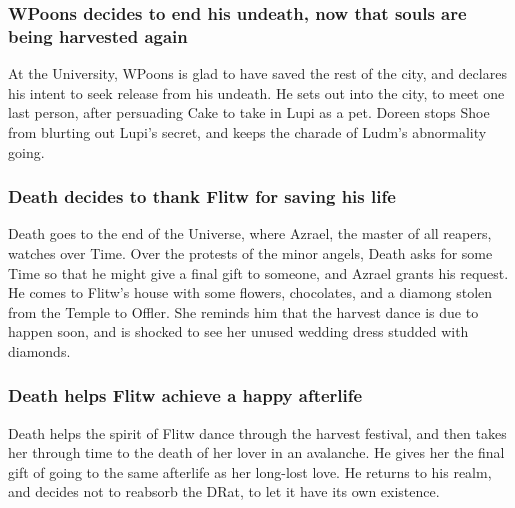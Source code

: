 \subsubsection{\Gls{WPoons} decides to end his undeath, now that souls are being harvested again}
At the University, \Gls{WPoons} is glad to have saved the rest of the city, and declares his intent
to seek release from his undeath. He sets out into the city, to meet one last person, after
persuading \Gls{Cake} to take in \Gls{Lupi} as a pet. \Gls{Doreen} stops \Gls{Shoe} from blurting
out \Gls{Lupi}'s secret, and keeps the charade of \Gls{Ludm}'s abnormality going.

\subsubsection{\Gls{Death} decides to thank \Gls{Flitw} for saving his life}
\Gls{Death} goes to the end of the Universe, where \Gls{Azrael}, the master of all reapers, watches
over Time. Over the protests of the minor angels, \Gls{Death} asks for some Time so that he might
give a final gift to someone, and \Gls{Azrael} grants his request. He comes to \Gls{Flitw}'s house
with some flowers, chocolates, and a diamong stolen from the Temple to Offler. She reminds him that
the harvest dance is due to happen soon, and is shocked to see her unused wedding dress studded with
diamonds.

\subsubsection{\Gls{Death} helps \Gls{Flitw} achieve a happy afterlife}
\Gls{Death} helps the spirit of \Gls{Flitw} dance through the harvest festival, and then takes her
through time to the death of her lover in an avalanche. He gives her the final gift of going to the
same afterlife as her long-lost love. He returns to his realm, and decides not to reabsorb the
\Gls{DRat}, to let it have its own existence.